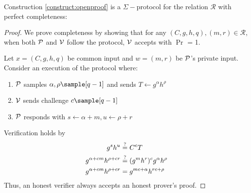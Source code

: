 \begin{theorem}
    Construction \ref{construct:openproof} is a $\Sigma-$protocol for the relation $\mathcal{R}$ with perfect completeness: 
\end{theorem}
\begin{proof}
    We prove completeness by showing that for any $(C, g, h, q),(m,r) \in \mathcal{R}$, when both $\mathcal{P}$ and $\mathcal{V}$ follow the protocol, $\mathcal{V}$ accepts with $\Pr$ = 1.

    Let $x = (C,g,h,q)$ be common input and $w = (m, r)$ be $\mathcal{P}$'s private input. Consider an execution of the protocol where:
    \begin{enumerate}
        \item $\mathcal{P}$ samples $\alpha, \rho \sample [q-1]$ and sends $T \gets g^{\alpha}h^{\rho}$
        \item $\mathcal{V}$ sends challenge $c \sample [q-1]$
        \item $\mathcal{P}$ responds with $s \gets \alpha+m, u \gets \rho+r$
    \end{enumerate}
    Verification holds by 
    \begin{align}
        g^sh^u &\stackrel{?}{=} C^cT \notag \\
        g^{\alpha + cm}h^{\rho + cr} &\stackrel{?}{=} (g^mh^r)^cg^{\alpha}h^{\rho} \notag  \\
        g^{\alpha + cm}h^{\rho + cr} &= g^{mc + \alpha} h^{rc + \rho} \notag 
    \end{align}
    Thus, an honest verifier always accepts an honest prover's proof.
\end{proof}


